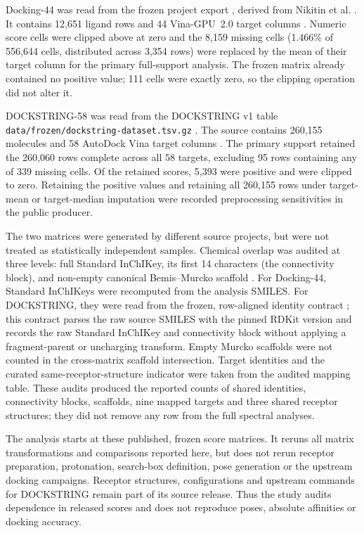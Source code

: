 Docking-44 was read from the frozen project export
, derived from Nikitin et al.
\cite{nikitin2025}.  It contains 12,651 ligand rows and 44 Vina-GPU~2.0 target
columns \cite{ding2023}.  Numeric score cells were clipped above at zero and
the 8,159 missing cells (1.466\% of 556,644 cells, distributed across 3,354
rows) were replaced by the mean of their target column for the primary
full-support analysis.  The frozen matrix already contained no positive value;
111 cells were exactly zero, so the clipping operation did not alter it.

DOCKSTRING-58 was read from the DOCKSTRING v1 table
\texttt{data/frozen/}\allowbreak\texttt{dockstring-}\allowbreak\texttt{dataset.tsv.gz}
\cite{dockstring2022}.  The source
contains 260,155 molecules and 58 AutoDock Vina target columns
\cite{vina2010}.  The primary support retained the 260,060 rows complete across
all 58 targets, excluding 95 rows containing any of 339 missing cells.  Of the
retained scores, 5,393 were positive and were clipped to zero.  Retaining the
positive values and retaining all 260,155 rows under target-mean or
target-median imputation were recorded preprocessing sensitivities in the
public producer.

The two matrices were generated by different source projects, but were not
treated as statistically independent samples.  Chemical overlap was audited at
three levels: full Standard InChIKey, its first 14 characters (the connectivity
block), and non-empty canonical Bemis--Murcko scaffold \cite{murcko1996}.  For
Docking-44, Standard InChIKeys were recomputed from the analysis SMILES.  For
DOCKSTRING, they were read from the frozen, row-aligned identity contract
; this contract
parses the raw source SMILES with the pinned RDKit version and records the raw
Standard InChIKey and connectivity block without applying a fragment-parent or
uncharging transform.  Empty Murcko scaffolds were not counted in the
cross-matrix scaffold intersection.  Target identities and the curated
same-receptor-structure indicator were taken from the audited mapping table.
These audits produced the reported counts of shared
identities, connectivity blocks, scaffolds, nine mapped targets and three
shared receptor structures; they did not remove any row from the full spectral
analyses.

The analysis starts at these published, frozen score matrices.  It reruns all
matrix transformations and comparisons reported here, but does not rerun
receptor preparation, protonation, search-box definition, pose generation or
the upstream docking campaigns.  Receptor structures, configurations and
upstream commands for DOCKSTRING remain part of its source release.  Thus the
study audits dependence in released scores and does not reproduce poses,
absolute affinities or docking accuracy.

